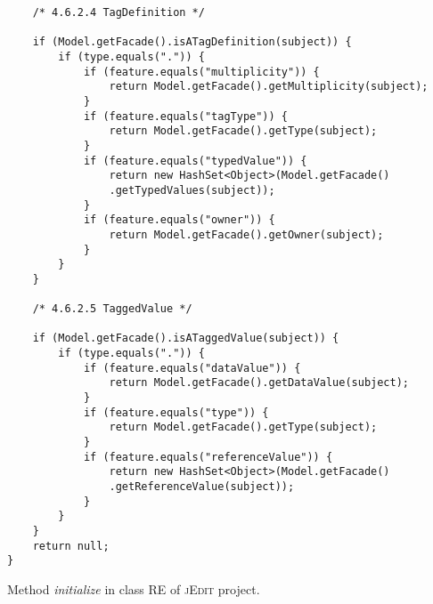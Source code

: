 \begin{mdframed}
\begin{lstlisting}
	/* 4.6.2.4 TagDefinition */          
	
	if (Model.getFacade().isATagDefinition(subject)) {
		if (type.equals(".")) {
			if (feature.equals("multiplicity")) {
				return Model.getFacade().getMultiplicity(subject);
			}
			if (feature.equals("tagType")) {
				return Model.getFacade().getType(subject);
			}
			if (feature.equals("typedValue")) {
				return new HashSet<Object>(Model.getFacade()
				.getTypedValues(subject));
			}
			if (feature.equals("owner")) {
				return Model.getFacade().getOwner(subject);
			}
		}
	}
	
	/* 4.6.2.5 TaggedValue */          
	
	if (Model.getFacade().isATaggedValue(subject)) {
		if (type.equals(".")) {
			if (feature.equals("dataValue")) {
				return Model.getFacade().getDataValue(subject);
			}
			if (feature.equals("type")) {
				return Model.getFacade().getType(subject);
			}
			if (feature.equals("referenceValue")) {
				return new HashSet<Object>(Model.getFacade()
				.getReferenceValue(subject));
			}
		}
	}
	return null;
}
\end{lstlisting}
\end{mdframed}

Method \textit{initialize} in class \textsc{RE} of \textsc{jEdit} project.

